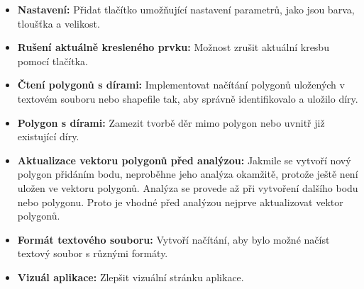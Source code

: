 \begin{itemize}
    \item \textbf{Nastavení:} Přidat tlačítko umožňující nastavení parametrů, jako jsou barva, tloušťka a velikost.

    \item \textbf{Rušení aktuálně kresleného prvku:}  Možnost zrušit aktuální kresbu pomocí tlačítka.

    \item \textbf{Čtení polygonů s dírami:} Implementovat načítání polygonů uložených v textovém souboru nebo shapefile tak, aby správně identifikovalo a uložilo díry.

    \item \textbf{Polygon s dírami:} Zamezit tvorbě děr mimo polygon nebo uvnitř již existující díry.

    \item \textbf{Aktualizace vektoru polygonů před analýzou:} Jakmile se vytvoří nový polygon přidáním bodu, neproběhne jeho analýza okamžitě, protože ještě není uložen ve vektoru polygonů. Analýza se provede až při vytvoření dalšího bodu nebo polygonu. Proto je vhodné před analýzou nejprve aktualizovat vektor polygonů.

    \item \textbf{Formát textového souboru:} Vytvoří načítání, aby bylo možné načíst textový soubor s různými formáty.

    \item \textbf{Vizuál aplikace:} Zlepšit vizuální stránku aplikace.

\end{itemize}
